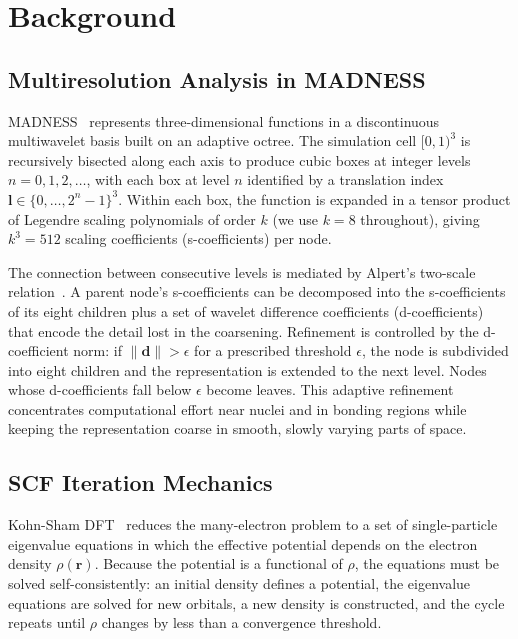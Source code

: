 \section{Background}\label{sec:background}

\subsection{Multiresolution Analysis in MADNESS}\label{sec:mra}

MADNESS~\cite{harrison2016madness} represents three-dimensional functions in a discontinuous multiwavelet basis built on an adaptive octree.
The simulation cell $[0,1)^3$ is recursively bisected along each axis to produce cubic boxes at integer levels $n = 0, 1, 2, \ldots$, with each box at level $n$ identified by a translation index $\mathbf{l} \in \{0, \ldots, 2^n - 1\}^3$.
Within each box, the function is expanded in a tensor product of Legendre scaling polynomials of order $k$ (we use $k = 8$ throughout), giving $k^3 = 512$ scaling coefficients (s-coefficients) per node.

The connection between consecutive levels is mediated by Alpert's two-scale relation~\cite{alpert1993twoscale}.
A parent node's s-coefficients can be decomposed into the s-coefficients of its eight children plus a set of wavelet difference coefficients (d-coefficients) that encode the detail lost in the coarsening.
Refinement is controlled by the d-coefficient norm: if $\|\mathbf{d}\| > \epsilon$ for a prescribed threshold $\epsilon$, the node is subdivided into eight children and the representation is extended to the next level.
Nodes whose d-coefficients fall below $\epsilon$ become leaves.
This adaptive refinement concentrates computational effort near nuclei and in bonding regions while keeping the representation coarse in smooth, slowly varying parts of space.

\subsection{SCF Iteration Mechanics}\label{sec:scf}

Kohn-Sham DFT~\cite{kohn1965self} reduces the many-electron problem to a set of single-particle eigenvalue equations in which the effective potential depends on the electron density $\rho(\mathbf{r})$.
Because the potential is a functional of $\rho$, the equations must be solved self-consistently: an initial density defines a potential, the eigenvalue equations are solved for new orbitals, a new density is constructed, and the cycle repeats until $\rho$ changes by less than a convergence threshold.

